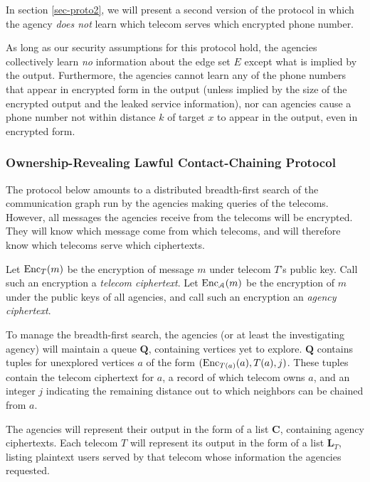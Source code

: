 In section \ref{sec-proto2}, we will present a second version of the protocol in which the agency \emph{does not} learn which telecom serves which encrypted phone number.


As long as our security assumptions for this protocol hold, the agencies collectively learn \emph{no} information about the edge set $E$ except what is implied by the output. Furthermore, the agencies cannot learn any of the phone numbers that appear in encrypted form in the output (unless implied by the size of the encrypted output and the leaked service information), nor can agencies cause a phone number not within distance $k$ of target $x$ to appear in the output, even in encrypted form.



\subsubsection{Ownership-Revealing Lawful Contact-Chaining Protocol}

\label{sec-proto1}



The protocol below amounts to a distributed breadth-first search of the communication graph run by the agencies making queries of the telecoms. However, all messages the agencies receive from the telecoms will be encrypted. They will know which message come from which telecoms, and will therefore know which telecoms serve which ciphertexts.



Let $\operatorname{Enc}_T(m)$ be the encryption of message $m$ under telecom $T$'s public key. Call such an encryption a \emph{telecom ciphertext}. Let $\operatorname{Enc}_\mathcal{A}(m)$ be the encryption of $m$ under the public keys of all agencies, and call such an encryption an \emph{agency ciphertext}.



To manage the breadth-first search, the agencies (or at least the investigating agency) will maintain a queue $\mathbf{Q}$, containing vertices yet to explore. $\mathbf{Q}$ contains tuples for unexplored vertices $a$ of the form $(\operatorname{Enc}_{T(a)}(a), T(a), j)$. These tuples contain the telecom ciphertext for $a$, a record of which telecom owns $a$, and an integer $j$ indicating the remaining distance out to which neighbors can be chained from $a$.



The agencies will represent their output in the form of a list $\mathbf{C}$, containing agency ciphertexts. Each telecom $T$ will represent its output in the form of a list $\mathbf{L}_T$, listing plaintext users served by that telecom whose information the agencies requested.



